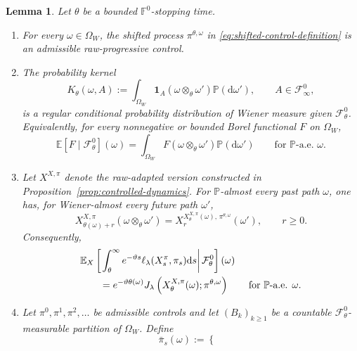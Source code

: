 \documentclass[11pt]{article}
\def\E{\mathbb{E}}
\def\P{\mathbb{P}}
\def\Fc{{\mathcal F}}
\def\id{\mathbf{1}}
\newcommand{\dd}{\mathrm{d}}
\newtheorem{lemma}[theorem]{Lemma}
\theoremstyle{definition}
\theoremstyle{remark}
\numberwithin{equation}{section}
\begin{document}
\begin{lemma}\label{lem:canonical-shift-control}
Let $\theta$ be a bounded $\mathbb F^0$-stopping time.
\begin{enumerate}[label=\textup{(\roman*)},leftmargin=2.3em]
\item For every $\omega\in\Omega_W$, the shifted process
$\pi^{\theta,\omega}$ in \eqref{eq:shifted-control-definition} is an admissible raw-progressive
control.
\item The probability kernel
\begin{equation}\label{eq:canonical-rcpd-kernel}
 K_\theta(\omega,A)
 :=\int_{\Omega_W}\id_A(\omega\otimes_\theta\omega')\P(\dd\omega'),
 \qquad A\in\Fc_\infty^0,
\end{equation}
is a regular conditional probability distribution of Wiener measure given $\Fc_\theta^0$.
Equivalently, for every nonnegative or bounded Borel functional $F$ on $\Omega_W$,
\begin{equation}\label{eq:canonical-conditional-formula}
 \E[F\mid\Fc_\theta^0](\omega)
 =\int_{\Omega_W}F(\omega\otimes_\theta\omega')\P(\dd\omega')
 \qquad\text{for }\P\text{-a.e. }\omega.
\end{equation}
\item Let $X^{X,\pi}$ denote the raw-adapted version constructed in
Proposition~\ref{prop:controlled-dynamics}.  For $\P$-almost every past path $\omega$, one has,
for Wiener-almost every future path $\omega'$,
\begin{equation}\label{eq:strong-flow-control}
 X_{\theta(\omega)+r}^{X,\pi}(\omega\otimes_\theta\omega')
 =X_r^{X_\theta^{X,\pi}(\omega),\,\pi^{\theta,\omega}}(\omega'),
 \qquad r\ge0.
\end{equation}
Consequently,
\begin{align}
 &\E_X\left[
  \left.
  \int_\theta^\infty e^{-\vartheta s}
  \ell_\lambda(X_s^\pi,\pi_s)\dd s
  \right|\Fc_\theta^0\right](\omega)
\notag\\
 &\qquad=e^{-\vartheta\theta(\omega)}
 J_\lambda\left(X_\theta^{X,\pi}(\omega);\pi^{\theta,\omega}\right)
 \qquad\text{for }\P\text{-a.e. }\omega.
 \label{eq:conditional-tail-cost-control}
\end{align}
\item Let $\pi^0,\pi^1,\pi^2,\ldots$ be admissible controls and let
$(B_k)_{k\ge1}$ be a countable $\Fc_\theta^0$-measurable partition of $\Omega_W$.  Define
\begin{equation}\label{eq:concatenated-control-definition}
 \bar\pi_s(\omega)
 :=
 \begin{cases}

\end{cases}
\end{equation}
\end{enumerate}
\end{lemma}
\end{document}
